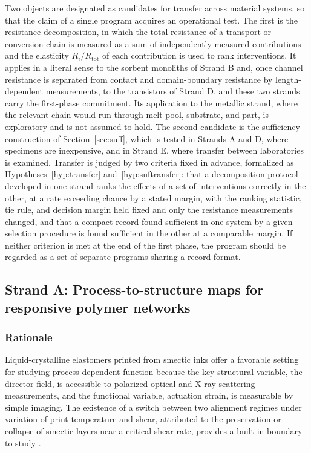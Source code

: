 \documentclass[11pt]{article}
\theoremstyle{definition}
\begin{document}
Two objects are designated as candidates for transfer across material systems, so that the claim of a single program acquires an operational test. The first is the resistance decomposition, in which the total resistance of a transport or conversion chain is measured as a sum of independently measured contributions and the elasticity $R_i/R_{\mathrm{tot}}$ of each contribution is used to rank interventions. It applies in a literal sense to the sorbent monoliths of Strand B and, once channel resistance is separated from contact and domain-boundary resistance by length-dependent measurements, to the transistors of Strand D, and these two strands carry the first-phase commitment. Its application to the metallic strand, where the relevant chain would run through melt pool, substrate, and part, is exploratory and is not assumed to hold. The second candidate is the sufficiency construction of Section~\ref{sec:suff}, which is tested in Strands A and D, where specimens are inexpensive, and in Strand E, where transfer between laboratories is examined. Transfer is judged by two criteria fixed in advance, formalized as Hypotheses~\ref{hyp:transfer} and~\ref{hyp:suftransfer}: that a decomposition protocol developed in one strand ranks the effects of a set of interventions correctly in the other, at a rate exceeding chance by a stated margin, with the ranking statistic, tie rule, and decision margin held fixed and only the resistance measurements changed, and that a compact record found sufficient in one system by a given selection procedure is found sufficient in the other at a comparable margin. If neither criterion is met at the end of the first phase, the program should be regarded as a set of separate programs sharing a record format.

\subsection{Strand A: Process-to-structure maps for responsive polymer networks}

\subsubsection*{Rationale}

Liquid-crystalline elastomers printed from smectic inks offer a favorable setting for studying process-dependent function because the key structural variable, the director field, is accessible to polarized optical and X-ray scattering measurements, and the functional variable, actuation strain, is measurable by simple imaging. The existence of a switch between two alignment regimes under variation of print temperature and shear, attributed to the preservation or collapse of smectic layers near a critical shear rate, provides a built-in boundary to study \cite{lee2026}.
\end{document}
